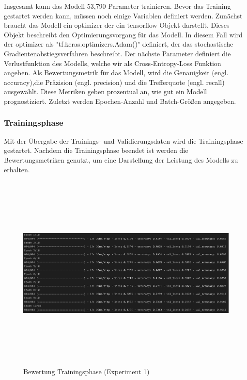 \documentclass[12pt]{scrreprt}
\begin{document}
Insgesamt kann das Modell 53,790 Parameter trainieren. Bevor das Training gestartet werden kann, müssen noch einige Variablen definiert werden. Zunächst braucht das Modell ein optimizer der ein tensorflow Objekt darstellt. Dieses Objekt beschreibt den Optimierungsvorgang für das Modell. In diesem Fall wird der optimizer als "tf.keras.optimizers.Adam()" definiert, der das stochastische Gradientenabstiegsverfahren beschreibt. Der nächste Parameter definiert die Verlustfunktion des Modells, welche wir als Cross-Entropy-Loss Funktion angeben. Als Bewertungsmetrik für das Modell, wird die Genauigkeit (engl. accuracy),die Präzision (engl. precision) und die Trefferquote (engl. recall) ausgewählt. Diese Metriken geben prozentual an, wie gut ein Modell prognostiziert. Zuletzt werden Epochen-Anzahl und Batch-Größen angegeben. 
	
\subsubsection{Trainingsphase}
	
Mit der Übergabe der Trainings- und Validierungsdaten wird die Trainingsphase gestartet. Nachdem die Trainingsphase beendet ist werden die Bewertungsmetriken genutzt, um eine Darstellung der Leistung des Modells zu erhalten.
	
\begin{figure}[h!]
	\centering
	\includegraphics[width=14cm, height=10cm]		{ExperimentModelTrainingsphase_1.png}
	\caption{ Bewertung Trainingsphase \cite{HK22}(Experiment 1)}
	\label{fig:fig14}
\end{figure}
	
\end{document}
